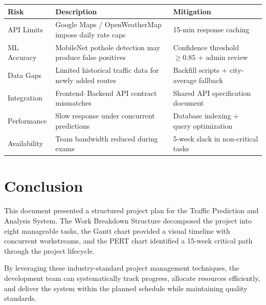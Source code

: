 \documentclass[12pt,a4paper]{article}
\begin{document}
\begin{center}
\begin{tabularx}{\textwidth}{l X l}
\toprule
\textbf{Risk} & \textbf{Description} & \textbf{Mitigation} \\
\midrule
API Limits & Google Maps / OpenWeatherMap impose daily rate caps & 15-min response caching \\[4pt]
ML Accuracy & MobileNet pothole detection may produce false positives & Confidence threshold $\geq 0.85$ + admin review \\[4pt]
Data Gaps & Limited historical traffic data for newly added routes & Backfill scripts + city-average fallback \\[4pt]
Integration & Frontend--Backend API contract mismatches & Shared API specification document \\[4pt]
Performance & Slow response under concurrent predictions & Database indexing + query optimization \\[4pt]
Availability & Team bandwidth reduced during exams & 5-week slack in non-critical tasks \\
\bottomrule
\end{tabularx}
\end{center}

\section{Conclusion}
This document presented a structured project plan for the Traffic Prediction and Analysis System. The Work Breakdown Structure decomposed the project into eight manageable tasks, the Gantt chart provided a visual timeline with concurrent workstreams, and the PERT chart identified a 15-week critical path through the project lifecycle.

By leveraging these industry-standard project management techniques, the development team can systematically track progress, allocate resources efficiently, and deliver the system within the planned schedule while maintaining quality standards.
\end{document}
